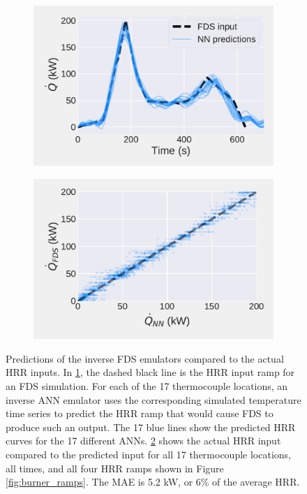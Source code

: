 \documentclass{article}
\begin{document}
\begin{figure}[htbp]
  \centering
  \begin{subfigure}[t]{.45\textwidth}
      \centering
      \includegraphics[width=\textwidth,keepaspectratio]{figures/backward_NN_examples.pdf}
      \caption{}
      \label{fig:backward_NN_examples}
  \end{subfigure}
  \begin{subfigure}[t]{.45\textwidth}
      \centering
      \includegraphics[width=\textwidth ,keepaspectratio]{figures/backward_error_scatter.pdf}
      \caption{}
      \label{fig:backward_error_scatter}
  \end{subfigure}
  \caption{Predictions of the inverse FDS emulators compared to the actual HRR inputs. In \protect\ref{fig:backward_NN_examples}, the dashed black line is the HRR input ramp for an FDS simulation. For each of the 17 thermocouple locations, an inverse ANN emulator uses the corresponding simulated temperature time series to predict the HRR ramp that would cause FDS to produce such an output. The 17 blue lines show the predicted HRR curves for the 17 different ANNs. \protect\ref{fig:backward_error_scatter} shows the actual HRR input compared to the predicted input for all 17 thermocouple locations, all times, and all four HRR ramps shown in Figure \protect\ref{fig:burner_ramps}. The MAE is 5.2 kW, or 6\% of the average HRR.} 
  \label{fig:backward_examples}
\end{figure}
\end{document}
